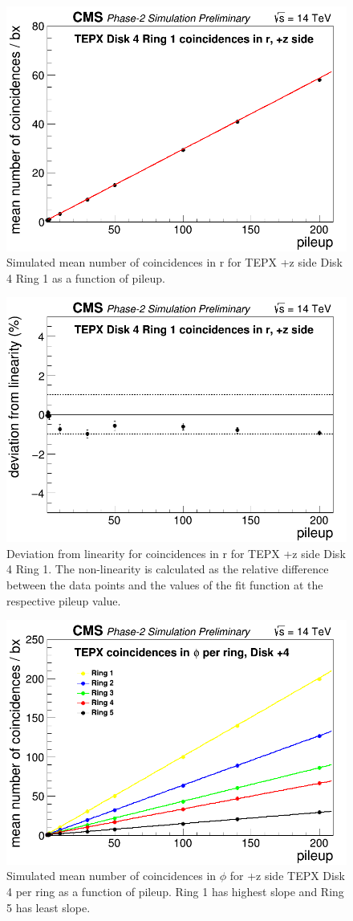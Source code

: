 \begin{figure}[H]
  \centering
  \includegraphics[width=0.5\columnwidth]{./TEPX_Disk_4_Ring_1_coincidences_in_r__pz_side_mean_number_of_coincidences___bx_Linearity.png}
  \caption{Simulated mean number of coincidences in r for TEPX +z side Disk 4 Ring 1 as a function of pileup.}
  \label{fig:CMS}
\end{figure}


\begin{figure}[H]
  \centering
  \includegraphics[width=0.5\columnwidth]{./TEPX_Disk_4_Ring_1_coincidences_in_r__pz_side_mean_number_of_coincidences___bx_Linearity_residuals.png}
  \caption{Deviation from linearity for coincidences in r for TEPX +z side Disk 4 Ring 1. The non-linearity is calculated as the relative difference between the data points and the values of the fit function at the respective pileup value.}
  \label{fig:CMS}
\end{figure}



\begin{figure}[H]
  \centering
  \includegraphics[width=0.5\columnwidth]{./TEPX_coincidences_in_phi_per_ring_mean_number_of_coincidences___bxDisk4_Linearity.png}
  \caption{Simulated mean number of coincidences in $\phi$ for +z side TEPX Disk 4 per ring as a function of pileup. Ring 1 has highest slope and Ring 5 has least slope.}
  \label{fig:CMS}
\end{figure}



